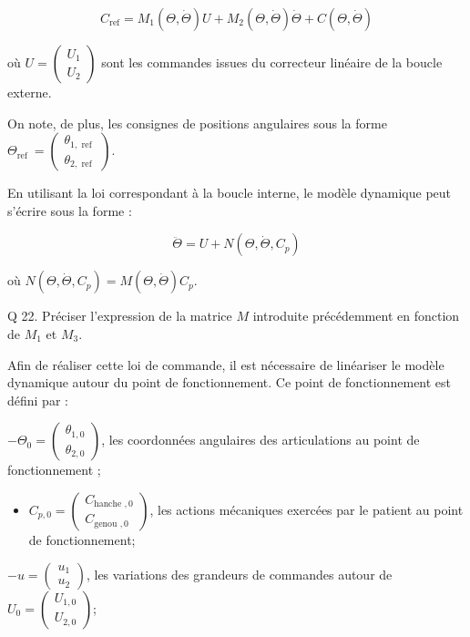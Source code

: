 \documentclass[10pt]{article}
\begin{document}
$$
C_{\mathrm{ref}}=M_{1}(\Theta, \dot{\Theta}) U+M_{2}(\Theta, \dot{\Theta}) \dot{\Theta}+C(\Theta, \dot{\Theta})
$$

où $U=\left(\begin{array}{l}U_{1} \\ U_{2}\end{array}\right)$ sont les commandes issues du correcteur linéaire de la boucle externe.

On note, de plus, les consignes de positions angulaires sous la forme $\Theta_{\text {ref }}=\left(\begin{array}{c}\theta_{1, \text { ref }} \\ \theta_{2, \text { ref }}\end{array}\right)$.

En utilisant la loi correspondant à la boucle interne, le modèle dynamique peut s'écrire sous la forme :

$$
\ddot{\Theta}=U+N\left(\Theta, \dot{\Theta}, C_{p}\right)
$$

où $N\left(\Theta, \dot{\Theta}, C_{p}\right)=M(\Theta, \dot{\Theta}) C_{p}$.

Q 22. Préciser l'expression de la matrice $M$ introduite précédemment en fonction de $M_{1}$ et $M_{3}$.

Afin de réaliser cette loi de commande, il est nécessaire de linéariser le modèle dynamique autour du point de fonctionnement. Ce point de fonctionnement est défini par :

$-\Theta_{0}=\left(\begin{array}{c}\theta_{1,0} \\ \theta_{2,0}\end{array}\right)$, les coordonnées angulaires des articulations au point de fonctionnement ;

\begin{itemize}
  \item $C_{p, 0}=\left(\begin{array}{c}C_{\text {hanche }, 0} \\ C_{\text {genou }, 0}\end{array}\right)$, les actions mécaniques exercées par le patient au point de fonctionnement;
\end{itemize}

$-u=\left(\begin{array}{l}u_{1} \\ u_{2}\end{array}\right)$, les variations des grandeurs de commandes autour de $U_{0}=\left(\begin{array}{c}U_{1,0} \\ U_{2,0}\end{array}\right)$;
\end{document}
